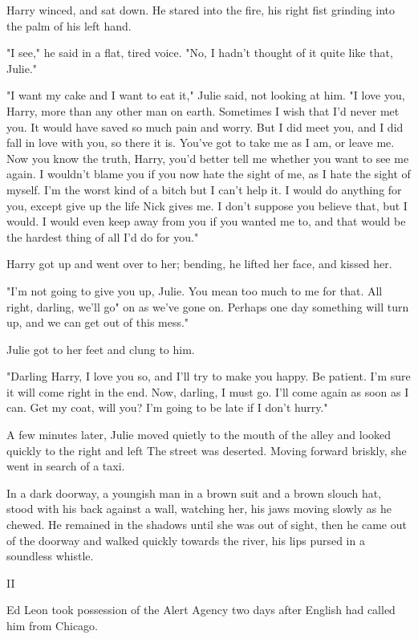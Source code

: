 \documentclass{novel}
\begin{document}
Harry winced, and sat down. He stared into the fire, his right fist grinding into the palm of his left hand.

"I see," he said in a flat, tired voice. "No, I hadn't thought of it quite like that, Julie."

"I want my cake and I want to eat it," Julie said, not looking at him. "I love you, Harry, more than any other man on earth. Sometimes I wish that I'd never met you. It would have saved so much pain and worry. But I did meet you, and I did fall in love with you, so there it is. You've got to take me as I am, or leave me. Now you know the truth, Harry, you'd better tell me whether you want to see me again. I wouldn't blame you if you now hate the sight of me, as I hate the sight of myself. I'm the worst kind of a bitch but I can't help it. I would do anything for you, except give up the life Nick gives me. I don't suppose you believe that, but I would. I would even keep away from you if you wanted me to, and that would be the hardest thing of all I'd do for you."

Harry got up and went over to her; bending, he lifted her face, and kissed her.

"I'm not going to give you up, Julie. You mean too much to me for that. All right, darling, we'll go" on as we've gone on. Perhaps one day something will turn up, and we can get out of this mess."

Julie got to her feet and clung to him.

"Darling Harry, I love you so, and I'll try to make you happy. Be patient. I'm sure it will come right in the end. Now, darling, I must go. I'll come again as soon as I can. Get my coat, will you? I'm going to be late if I don't hurry."

A few minutes later, Julie moved quietly to the mouth of the alley and looked quickly to the right and left The street was deserted. Moving forward briskly, she went in search of a taxi.

In a dark doorway, a youngish man in a brown suit and a brown slouch hat, stood with his back against a wall, watching her, his jaws moving slowly as he chewed. He remained in the shadows until she was out of sight, then he came out of the doorway and walked quickly towards the river, his lips pursed in a soundless whistle.



II

Ed Leon took possession of the Alert Agency two days after English had called him from Chicago.
\end{document}
